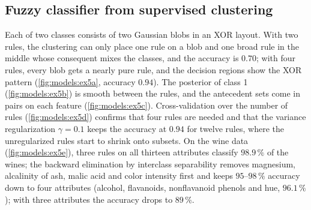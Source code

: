 \subsection{Fuzzy classifier from supervised clustering}

Each of two classes consists of two Gaussian blobs in an XOR layout. With two rules, the clustering can only place one rule on a blob and one broad rule in the middle whose consequent mixes the classes, and the accuracy is $0.70$; with four rules, every blob gets a nearly pure rule, and the decision regions show the XOR pattern (\cref{fig:models:ex5a}, accuracy $0.94$). The posterior of class 1 (\cref{fig:models:ex5b}) is smooth between the rules, and the antecedent sets come in pairs on each feature (\cref{fig:models:ex5c}). Cross-validation over the number of rules (\cref{fig:models:ex5d}) confirms that four rules are needed and that the variance regularization $\gamma=0.1$ keeps the accuracy at $0.94$ for twelve rules, where the unregularized rules start to shrink onto subsets. On the wine data (\cref{fig:models:ex5e}), three rules on all thirteen attributes classify $98.9\,\%$ of the wines; the backward elimination by interclass separability removes magnesium, alcalinity of ash, malic acid and color intensity first and keeps $95$--$98\,\%$ accuracy down to four attributes (alcohol, flavanoids, nonflavanoid phenols and hue, $96.1\,\%$); with three attributes the accuracy drops to $89\,\%$.


